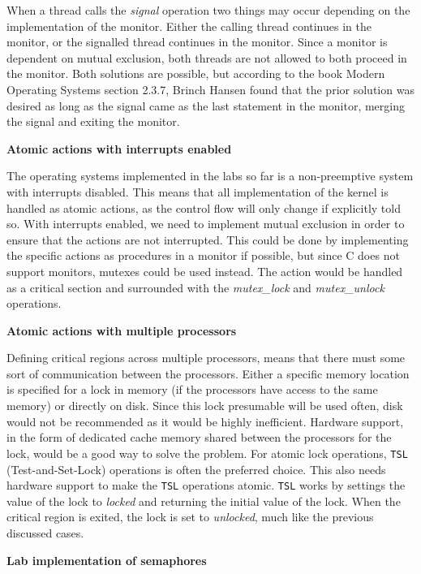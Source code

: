 When a thread calls the \textit{signal} operation two things may occur depending on the implementation of the monitor. Either the calling thread continues in the monitor, or the signalled thread continues in the monitor. Since a monitor is dependent on mutual exclusion, both threads are not allowed to both proceed in the monitor. Both solutions are possible, but according to the book Modern Operating Systems \cite{tanembaum} section 2.3.7, Brinch Hansen found that the prior solution was desired as long as the signal came as the last statement in the monitor, merging the signal and exiting the monitor.

\textbf{Atomic actions with interrupts enabled}

The operating systems implemented in the labs so far is a non-preemptive system with interrupts disabled. This means that all implementation of the kernel is handled as atomic actions, as the control flow will only change if explicitly told so. With interrupts enabled, we need to implement mutual exclusion in order to ensure that the actions are not interrupted. This could be done by implementing the specific actions as procedures in a monitor if possible, but since C does not support monitors, mutexes could be used instead. The action would be handled as a critical section and surrounded with the \textit{mutex\_lock} and \textit{mutex\_unlock} operations.

\textbf{Atomic actions with multiple processors}

Defining critical regions across multiple processors, means that there must some sort of communication between the processors. Either a specific memory location is specified for a lock in memory (if the processors have access to the same memory) or directly on disk. Since this lock presumable will be used often, disk would not be recommended as it would be highly inefficient. Hardware support, in the form of dedicated cache memory shared between the processors for the lock, would be a good way to solve the problem. For atomic lock operations, \texttt{TSL} (Test-and-Set-Lock) operations is often the preferred choice. This also needs hardware support to make the \texttt{TSL} operations atomic. \texttt{TSL} works by settings the value of the lock to \textit{locked} and returning the initial value of the lock. When the critical region is exited, the lock is set to \textit{unlocked}, much like the previous discussed cases.

\textbf{Lab implementation of semaphores}

